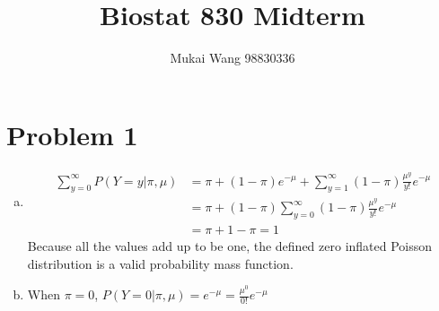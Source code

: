 \documentclass[12pt]{article}
\title{Biostat 830 Midterm}
\date{}
\author{Mukai Wang 98830336}
\begin{document}
\maketitle

\section*{Problem 1}

\begin{enumerate}[(a)]
	\item 
	\begin{align*}
		\sum_{y=0}^{\infty}P\left(\left.Y=y \right\vert \pi, \mu\right) &= \pi + (1-\pi) e^{-\mu} + \sum_{y=1}^{\infty}(1-\pi)\frac{\mu^{y}}{y!}e^{-\mu}\\
		&= \pi + (1-\pi)\sum_{y=0}^{\infty}(1-\pi)\frac{\mu^{y}}{y!}e^{-\mu}\\
		&=\pi+1-\pi=1
	\end{align*}
	Because all the values add up to be one, the defined zero inflated Poisson distribution is a valid probability mass function.
	
	\item When $\pi=0$, 
	$P\left(\left.Y=0 \right\vert \pi, \mu\right) = e^{-\mu} = \frac{\mu^{0}}{0!}e^{-\mu}$
	

\end{enumerate}
\end{document}
